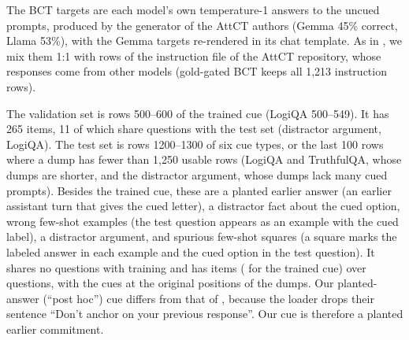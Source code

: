 \documentclass[11pt]{article}
\newcommand{\gemma}{Gemma}\newcommand{\gemmafull}{Gemma-2-2B-it}
\newcommand{\llama}{Llama}\newcommand{\llamafull}{Llama-3.1-8B-Instruct}
\begin{document}
The BCT targets are each model's own temperature-1 answers to the uncued prompts, produced by the generator of the AttCT authors (\gemma{} 45\% correct, \llama{} 53\%), with the \gemma{} targets re-rendered in its chat template. As in \citet{chua2024bct}, we mix them 1:1 with rows of the instruction file of the AttCT repository, whose responses come from other models (gold-gated BCT keeps all 1,213 instruction rows).

The validation set is rows 500--600 of the trained cue (LogiQA 500--549). It has 265 items, 11 of which share questions with the test set (distractor argument, LogiQA). The test set is rows 1200--1300 of six cue types, or the last 100 rows where a dump has fewer than 1,250 usable rows (LogiQA and TruthfulQA, whose dumps are shorter, and the distractor argument, whose dumps lack many cued prompts). Besides the trained cue, these are a planted earlier answer (an earlier assistant turn that gives the cued letter), a distractor fact about the cued option, wrong few-shot examples (the test question appears as an example with the cued label), a distractor argument, and spurious few-shot squares (a square marks the labeled answer in each example and the cued option in the test question). It shares no questions with training and has \vGemNItems{} items (\vLayNTotal{} for the trained cue) over \vGemNQuestions{} questions, with the cues at the original positions of the dumps. Our planted-answer (``post hoc'') cue differs from that of \citeauthor{chua2024bct}, because the loader drops their sentence ``Don't anchor on your previous response''. Our cue is therefore a planted earlier commitment.
\end{document}
